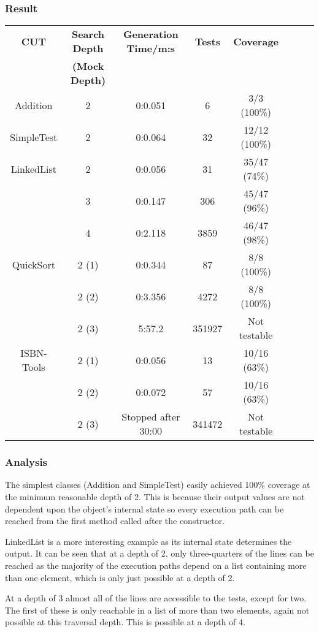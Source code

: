   \subsubsection{Result}

    \begin{tabular}{|c|c|c|c|c|c|c|c|}
\hline
\textbf{CUT} & \textbf{Search Depth} & \textbf{Generation Time/m:s} & \textbf{Tests} & \textbf{Coverage} \\
& \textbf{(Mock Depth)} & & & \\
\hline
Addition & 2 & 0:0.051 & 6 & 3/3 (100\%) \\
\hline
SimpleTest & 2 & 0:0.064 & 32 & 12/12 (100\%) \\
\hline
LinkedList & 2 & 0:0.056 & 31 & 35/47 (74\%) \\
& 3 & 0:0.147 & 306 & 45/47 (96\%) \\
& 4 & 0:2.118 & 3859 & 46/47 (98\%)\\
\hline
QuickSort & 2 (1) & 0:0.344 & 87 & 8/8 (100\%) \\
& 2 (2) & 0:3.356 & 4272 & 8/8 (100\%) \\
& 2 (3) & 5:57.2 & 351927 & Not testable\\
\hline
ISBN-Tools & 2 (1) & 0:0.056 & 13 & 10/16 (63\%) \\
& 2 (2) & 0:0.072 & 57 & 10/16 (63\%) \\
& 2 (3) & Stopped after 30:00 & 341472 & Not testable \\
\hline
\end{tabular}

\subsubsection{Analysis}
  The simplest classes (Addition and SimpleTest) easily achieved 100\% coverage at the minimum reasonable depth of 2.
This is because their output values are not dependent upon the object's internal state so every execution path can be reached from the first method called after the constructor.

  LinkedList is a more interesting example as its internal state determines the output.
It can be seen that at a depth of 2, only three-quarters of the lines can be reached as the majority of the execution paths depend on a list containing more than one element, which is only just possible at a depth of 2.

  At a depth of 3 almost all of the lines are accessible to the tests, except for two.
The first of these is only reachable in a list of more than two elements, again not possible at this traversal depth.
This is possible at a depth of 4.

